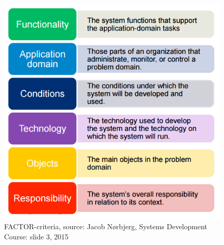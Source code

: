 \begin{figure}[H]
    \centering
    \includegraphics[scale=0.6]{Images/BATOFF.PNG}
    \caption{FACTOR-criteria, source: Jacob Nørbjerg, Systems Development Course: slide 3, 2015}
    \label{fig:FACTOR-criteria}
\end{figure}

\newpage

















